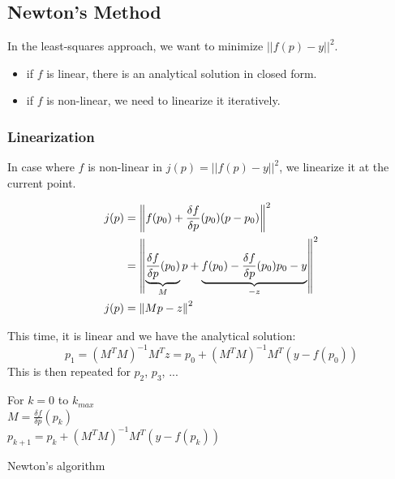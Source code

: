 \subsection{Newton's Method}

In the least-squares approach, we want to minimize $||f(p)-y||^2$. 
\begin{itemize}
    \item if $f$ is linear, there is an analytical solution in closed form.
    \item if $f$ is non-linear, we need to linearize it iteratively.
\end{itemize}


\subsubsection{Linearization}
In case where $f$ is non-linear in $j(p) = ||f(p)-y||^2$, we linearize it at the current point.

\begin{equation}
\begin{split}
    j(p) &= \left\lVert f(p_0) + \frac{\delta f}{\delta p}(p_0) (p-p_0)\right\rVert^2 \\
    &= \left\lVert\underbrace{\frac{\delta f}{\delta p}(p_0)}_{M} p + \underbrace{f(p_0) - \frac{\delta f}{\delta p}(p_0)p_0 - y}_{-z}\right\rVert^2 \\
    j(p) &= \left\lVert Mp - z\right\rVert^2
\end{split}
\end{equation}

This time, it is linear and we have the analytical solution:
\begin{equation}
    p_1 = (M^TM)^{-1}M^Tz = p_0 + (M^TM)^{-1}M^T (y-f(p_0))
\end{equation}
This is then repeated for $p_2$, $p_3$, ...
 
\begin{algorithm}[H]
\DontPrintSemicolon
{}
\KwOutput{}
For $k=0$ to $k_{max}$\\
$M = \frac{\delta f}{\delta p}(p_k)$ \\
$p_{k+1}= p_k + (M^TM)^{-1}M^T (y-f(p_k))$
\caption{Newton's algorithm}
\end{algorithm}

